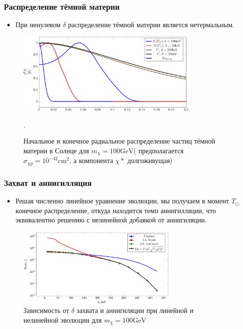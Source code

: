 \documentclass[
11pt,]{beamer}
\begin{document}
	
	\begin{frame}
		\frametitle{Распределение тёмной материи}
		\begin{itemize}
	\item При ненулевом $\delta$ распределение тёмной материи является нетермальным.
\end{itemize}
\begin{figure}[!h]
	\centering
	\includegraphics[width=0.8\textwidth]{images/Rdistribs.png}
	\caption{Начальное и конечное радиальное распределение частиц тёмной материи в Солнце для $m_{\chi} = 100\text{GeV}$( предполагается $\sigma_{\chi p} = 10^{-42} \text{cm}^2$, а компонента $\chi*$ долгоживущая)}.
	\label{plot:Nrdistrib}
\end{figure}

	\end{frame}
	\begin{frame}
		\frametitle{Захват и аннигилляция}
		\begin{itemize}
	\item Решая численно линейное уравнение эволюции, мы получаем в момент $T_{\odot}$ конечное распределение, откуда находится темп аннигилляции, что эквивалентно решению с нелинейной добавкой от аннигиляции.
\end{itemize}


\begin{figure}[!h]
	\centering
	\includegraphics[width=0.7\textwidth]{images/LinearNonLinear.png}
	\caption{Зависимость от $\delta$ захвата и аннигиляции при линейной и нелинейной эволюции для $m_{\chi} = 100\text{GeV}$}
\end{figure}

	\end{frame}
	
\end{document}
